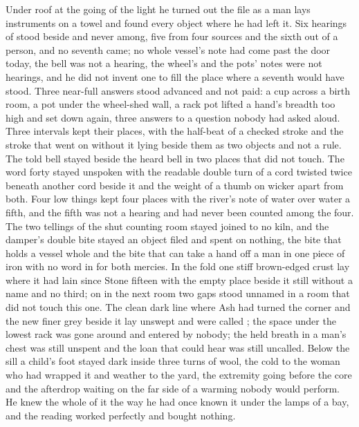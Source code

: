 Under  roof at the going of the light he turned out the file as a man lays instruments on a towel and found every object where he had left it. Six hearings of  stood beside and never among, five from four sources and the sixth out of a person, and no seventh came; no whole vessel's note had come past the door today, the bell was not a hearing, the wheel's and the pots' notes were not hearings, and he did not invent one to fill the place where a seventh would have stood. Three near-full answers stood advanced and not paid: a cup across a birth room, a pot under the wheel-shed wall, a rack pot lifted a hand's breadth too high and set down again, three answers to a question nobody had asked aloud. Three intervals kept their places, with the half-beat of a checked stroke and the stroke that went on without it lying beside them as two objects and not a rule. The told bell stayed beside the heard bell in two places that did not touch. The word forty stayed unspoken with the readable double turn of a cord twisted twice beneath another cord beside it and the weight of a thumb on wicker apart from both. Four low things kept four places with the river's note of water over water a fifth, and the fifth was not a hearing and had never been counted among the four. The two tellings of the shut counting room stayed joined to no kiln, and the damper's double bite stayed an object filed and spent on nothing, the bite that holds a vessel whole and the bite that can take a hand off a man in one piece of iron with no word in  for both mercies. In the fold one stiff brown-edged crust lay where it had lain since Stone fifteen with the empty place beside it still without a name and no third; on  in the next room two gaps stood unnamed in a room that did not touch this one. The clean dark line where Ash had turned the corner and the new finer grey beside it lay unswept and were called ; the space under the lowest rack was gone around and entered by nobody; the held breath in a man's chest was still unspent and the loan that could hear was still uncalled. Below the sill a child's foot stayed dark inside three turns of wool, the cold to the woman who had wrapped it and weather to the yard, the extremity going before the core and the afterdrop waiting on the far side of a warming nobody would perform. He knew the whole of it the way he had once known it under the lamps of a bay, and the reading worked perfectly and bought nothing.

